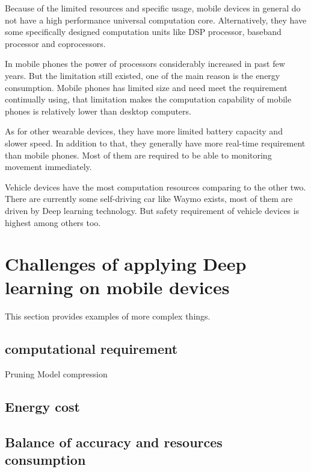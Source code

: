 \documentclass[article]{aaltoseries}
\begin{document}
Because of the limited resources and specific usage, mobile devices in general do not have a high performance 
universal computation core. Alternatively, they have some specifically designed computation units like DSP processor,
baseband processor and coprocessors.

In mobile phones the power of processors considerably increased in past few years. But the limitation still existed, 
one of the main reason is the energy consumption. Mobile phones has limited size and need meet the requirement continually
using, that limitation makes the computation capability of mobile phones is relatively lower than desktop computers.

As for other wearable devices, they have more limited battery capacity and slower speed. In addition to that, 
they generally have more real-time requirement than mobile phones. Most of them are required to be able to monitoring
movement immediately.

Vehicle devices have the most computation resources comparing to the other two. There are currently some self-driving
car like Waymo exists, most of them are driven by Deep learning technology. But safety requirement of vehicle devices
is highest among others too.  








\section{Challenges of applying Deep learning on mobile devices}

This section provides examples of more complex things.




\subsection{computational requirement}
Pruning
Model compression

\subsection{Energy cost}

\subsection{Balance of accuracy and resources consumption}
\end{document}
